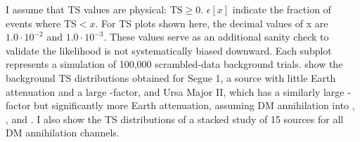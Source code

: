 I assume that TS values are physical: $ \mathrm{TS} \ge 0 $.
$\epsilon[x] $ indicate the fraction of events where $ \mathrm{TS} < x $. For TS plots shown here, the decimal values of x are $1.0 \cdot 10^{-2}$ and $1.0 \cdot 10^{-3}$.
These values serve as an additional sanity check to validate the likelihood is not systematically biased downward.
Each subplot represents a simulation of 100,000 scrambled-data background trials.
 show the background TS distributions obtained for Segue 1, a source with little Earth attenuation and a large \J-factor, and Ursa Major II, which has a similarly large \J-factor but significantly more Earth attenuation, assuming DM annihilation into , \parpar{\tau}, and \parpar{\nu_\mu}.
I also show the TS distributions of a stacked study of 15 sources for all DM annihilation channels.


